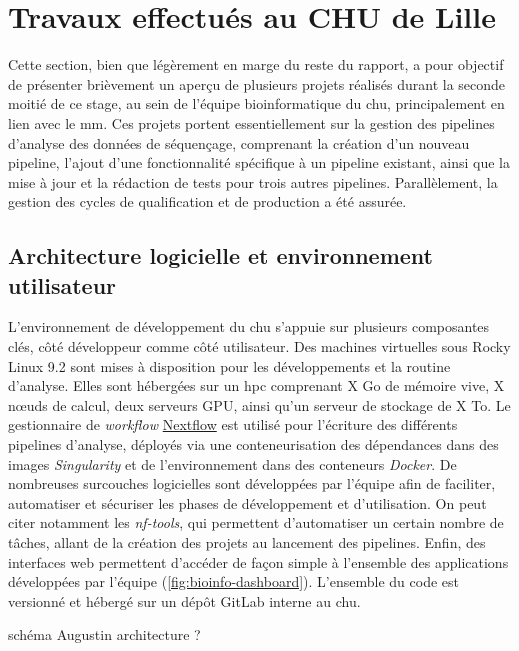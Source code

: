 \chapter{Travaux effectués au CHU de Lille}

Cette section, bien que légèrement en marge du reste du rapport, a pour objectif de présenter brièvement un aperçu 
de plusieurs projets réalisés durant la seconde moitié de ce stage, au sein de l'équipe bioinformatique du \gls{chu}, 
principalement en lien avec le \gls{mm}. Ces projets portent essentiellement sur la gestion des pipelines d'analyse 
des données de séquençage, comprenant la création d'un nouveau pipeline, l'ajout d'une fonctionnalité spécifique à 
un pipeline existant, ainsi que la mise à jour et la rédaction de tests pour trois autres pipelines. Parallèlement, 
la gestion des cycles de qualification et de production a été assurée.

\section{Architecture logicielle et environnement utilisateur}

L'environnement de développement du \gls{chu} s'appuie sur plusieurs composantes clés, côté développeur comme côté utilisateur.
Des machines virtuelles sous Rocky Linux 9.2 sont mises à disposition pour les développements et la routine d'analyse.
Elles sont hébergées sur un \gls{hpc} comprenant X Go de mémoire vive, X nœuds de calcul, deux serveurs GPU, ainsi qu'un serveur de stockage de X To.
Le gestionnaire de \textit{workflow} \href{https://www.nextflow.io/}{Nextflow} est utilisé pour l'écriture des différents pipelines d'analyse, 
déployés via une conteneurisation des dépendances dans des images \textit{Singularity} et de l'environnement dans des conteneurs \textit{Docker}.
De nombreuses surcouches logicielles sont développées par l'équipe afin de faciliter, automatiser et sécuriser les phases de développement et d'utilisation.
On peut citer notamment les \textit{nf-tools}, qui permettent d'automatiser un certain nombre de tâches, allant de la création des projets au lancement des pipelines.
Enfin, des interfaces web permettent d'accéder de façon simple à l'ensemble des applications développées par l'équipe (\autoref{fig:bioinfo-dashboard}).
L'ensemble du code est versionné et hébergé sur un dépôt GitLab interne au \gls{chu}.

schéma Augustin architecture ? 

